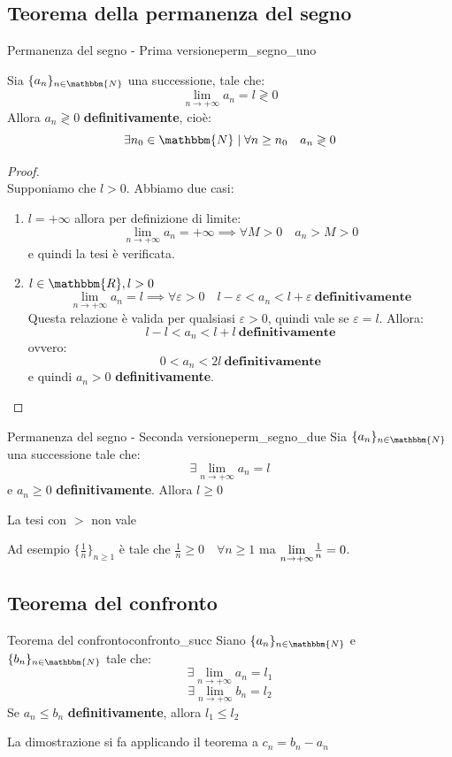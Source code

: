 \documentclass[12pt]{report}
\newcounter{theorem}
\newcommand{\namerefl}[1]{%
	\bgroup
	\let\nmu\MakeLowercase
	\nameref{#1}\egroup}
\newcommand{\nmu}{}
\begin{document}
	\subsection{Teorema della permanenza del segno}
	\begin{theorem}{\nmu Permanenza del segno - Prima versione}{perm_segno_uno}

		Sia $\{a_n\}_{n \in \mathbbm{N}}$ una successione, tale che:
		\[
		\lim_{n \to +\infty}a_n = l \gtrless 0
		\]
		Allora $a_n \gtrless 0$ \textbf{definitivamente}, cioè:
		\[
		\exists n_0 \in \mathbbm{N} \mid \forall n \geq n_0 \quad a_n \gtrless 0
		\]
		\begin{proof} \quad \\
			Supponiamo che $l > 0$.
			Abbiamo due casi:
			\begin{enumerate}
				\item $l = +\infty$ allora per definizione di limite:
				\[
				\lim_{n \to +\infty}a_n = +\infty \implies \forall M > 0 \quad a_n > M > 0
				\]
				e quindi la tesi è verificata. \\
				\item $l \in \mathbbm{R}, l > 0$ \\
				\[
				\lim_{n \to +\infty}a_n = l \implies \forall \varepsilon > 0 \quad l-\varepsilon < a_n < l + \varepsilon\ \textbf{definitivamente}
				\]
				Questa relazione è valida per qualsiasi $\varepsilon > 0$, quindi vale se $\varepsilon=l$. Allora:
				\[
				l - l < a_n < l + l\ \textbf{definitivamente}
				\]
				ovvero:
				\[
				0 < a_n < 2l\ \textbf{definitivamente}
				\]
				e quindi $a_n > 0$ \textbf{definitivamente}.
			\end{enumerate}
		\end{proof}
	\end{theorem}
	\begin{theorem}{\nmu Permanenza del segno - Seconda versione}{perm_segno_due}
		Sia $\{a_n\}_{n \in \mathbbm{N}}$ una successione tale che:
		\[
		\exists \lim_{n \to +\infty} a_n = l
		\]
		e $a_n \geq 0$ \textbf{definitivamente}. Allora $l \geq 0$
		\begin{note}{}{}
			La tesi con $>$ non vale
		\end{note}
		Ad esempio $\{\frac{1}{n}\}_{n \geq 1}$ è tale che $\frac{1}{n} \geq 0 \quad \forall n \geq 1$ ma $\mathlarger{\lim_{n \to +\infty}}\frac{1}{n} = 0$.
	\end{theorem}
	\subsection{Teorema del confronto}
	\begin{theorem}{\nmu Teorema del confronto}{confronto_succ}
		Siano $\{a_n\}_{n \in \mathbbm{N}}$ e $\{b_n\}_{n \in \mathbbm{N}}$ tale che:
		\[
		\exists \lim_{n \to +\infty}a_n = l_1
		\]
		\[
		\exists \lim_{n \to +\infty}b_n = l_2
		\]
		Se $a_n \leq b_n$ \textbf{definitivamente}, allora $l_1 \leq l_2$ \\
		\begin{note}{}{}
			La dimostrazione si fa applicando il teorema \namerefl{th:perm_segno_due} a $c_n = b_n - a_n$
		\end{note}
	\end{theorem}
\end{document}

